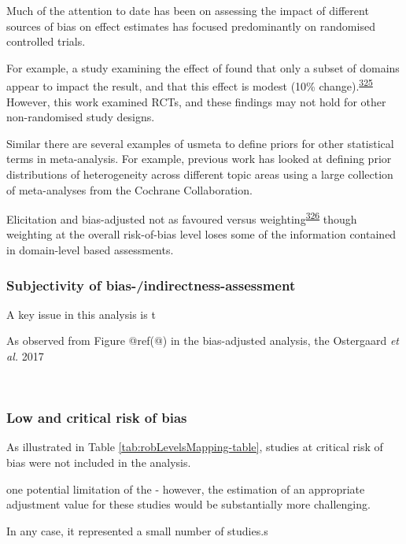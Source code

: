 \documentclass[a4paper, twoside]{templates/ociamthesis}
\begin{document}
Much of the attention to date has been on assessing the impact of different sources of bias on effect estimates has focused predominantly on randomised controlled trials.

For example, a study examining the effect of found that only a subset of domains appear to impact the result, and that this effect is modest (10\% change).\textsuperscript{\protect\hyperlink{ref-savovic2018}{325}} However, this work examined RCTs, and these findings may not hold for other non-randomised study designs.

Similar there are several examples of usmeta to define priors for other statistical terms in meta-analysis. For example, previous work has looked at defining prior distributions of heterogeneity across different topic areas using a large collection of meta-analyses from the Cochrane Collaboration.

Elicitation and bias-adjusted not as favoured versus weighting\textsuperscript{\protect\hyperlink{ref-stone2020}{326}} though weighting at the overall risk-of-bias level loses some of the information contained in domain-level based assessments.

\hypertarget{subjectivity-of-bias-indirectness-assessment}{%
\subsubsection{Subjectivity of bias-/indirectness-assessment}\label{subjectivity-of-bias-indirectness-assessment}}

A key issue in this analysis is t

As observed from Figure @ref(@) in the bias-adjusted analysis, the Ostergaard \emph{et al.} 2017

~

\hypertarget{low-and-critical-risk-of-bias}{%
\subsubsection{Low and critical risk of bias}\label{low-and-critical-risk-of-bias}}

As illustrated in Table \ref{tab:robLevelsMapping-table}, studies at critical risk of bias were not included in the analysis.

one potential limitation of the - however, the estimation of an appropriate adjustment value for these studies would be substantially more challenging.

In any case, it represented a small number of studies.s
\end{document}
